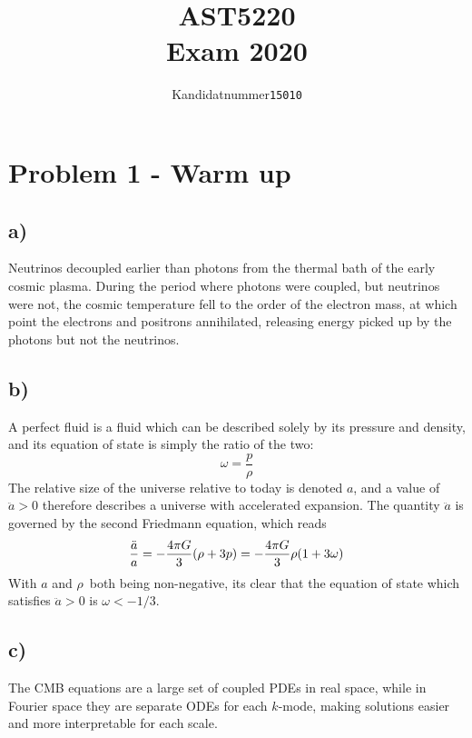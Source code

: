 \documentclass[10pt, a4paper]{article}
\begin{document}
\title{AST5220\\ Exam 2020}
\author{
    \begin{tabular}{r l}
        Kandidatnummer & \texttt{15010}
    \end{tabular}}

\maketitle

\section*{Problem 1 - Warm up}
\subsection*{a)}
Neutrinos decoupled earlier than photons from the thermal bath of the early cosmic plasma. During the period where photons were coupled, but neutrinos were not, the cosmic temperature fell to the order of the electron mass, at which point the electrons and positrons annihilated, releasing energy picked up by the photons but not the neutrinos.


\subsection*{b)}
A perfect fluid is a fluid which can be described solely by its pressure and density, and its equation of state is simply the ratio of the two:
\begin{equation}
    \omega = \frac{p}{\rho}
\end{equation}
The relative size of the universe relative to today is denoted $a$, and a value of $\ddot{a} > 0$ therefore describes a universe with accelerated expansion. The quantity $\ddot{a}$ is governed by the second Friedmann equation, which reads
\begin{equation}
    \frac{\ddot{a}}{a} = -\frac{4\pi G}{3}\qty(\rho + 3p) = - \frac{4\pi G}{3}\rho\qty(1 + 3\omega)
\end{equation}
With $a$ and $\rho$ both being non-negative, its clear that the equation of state which satisfies $\ddot{a} > 0$ is $\omega < -1/3$.


\subsection*{c)}
The CMB equations are a large set of coupled PDEs in real space, while in Fourier space they are separate ODEs for each $k$-mode, making solutions easier and more interpretable for each scale.
\end{document}
